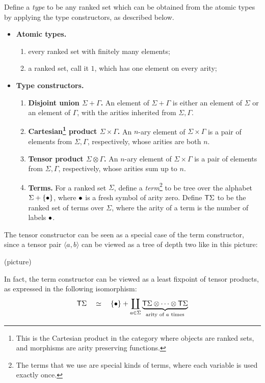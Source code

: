 \begin{definition}[Types]\label{def:types}
    Define a \emph{type} to be any ranked set which can be obtained from the atomic types by applying the type constructors, as described below.
    \begin{itemize}
        \item {\bf Atomic types.} 
           \begin{enumerate}
            \item every ranked set with finitely many elements;
            \item a ranked set, call it  $1$, which has one element on every arity;
        \end{enumerate}
    \item {\bf Type constructors.} 
     \begin{enumerate}
        \item {\bf Disjoint union $\Sigma+\Gamma$.} An element of $\Sigma+\Gamma$ is either an element of $\Sigma$ or an element of $\Gamma$, with the arities inherited from $\Sigma,\Gamma$. 
        \item {\bf Cartesian\footnote{This is the Cartesian product in the category where objects are ranked sets, and morphisms are arity preserving functions.}  product $\Sigma \times \Gamma$.} An  $n$-ary element of $\Sigma \times \Gamma$ is a pair of elements from $\Sigma, \Gamma$, respectively, whose arities are both $n$.
        \item {\bf Tensor product $\Sigma \otimes \Gamma$.} An  $n$-ary element of $\Sigma \times \Gamma$ is a pair of elements from $\Sigma, \Gamma$, respectively, whose arities  sum up to $n$.
        \item {\bf Terms.} For a ranked set  $\Sigma$, define a \emph{term}\footnote{The terms that we use are special kinds of terms, where each variable is used exactly once.} to be tree over the alphabet $\Sigma + \{\bullet\}$, where $\bullet$ is a fresh symbol of arity zero. Define $\mathsf T \Sigma$ to be the ranked set of terms over $\Sigma$, where the arity of a term is the number of labels $\bullet$.
    \end{enumerate}  
    \end{itemize}
  
\end{definition}

\newcommand{\tensorpair}[2]{\langle #1, #2 \rangle}

The tensor constructor can be seen as a special case of the term constructor, since a tensor pair $\tensorpair a b$  can be viewed as a tree of depth two like in this picture:
\begin{center}
    (picture)
\end{center}
In fact, the term constructor can be viewed as a least fixpoint of tensor products, as expressed in the following isomorphism:
\begin{align*}
    \mathsf T \Sigma \quad \simeq \quad  \{\bullet\} + \coprod_{a \in \Sigma} \underbrace{\mathsf T \Sigma \otimes \cdots \otimes \mathsf T \Sigma}_{\text{arity of $a$ times}}
\end{align*}


